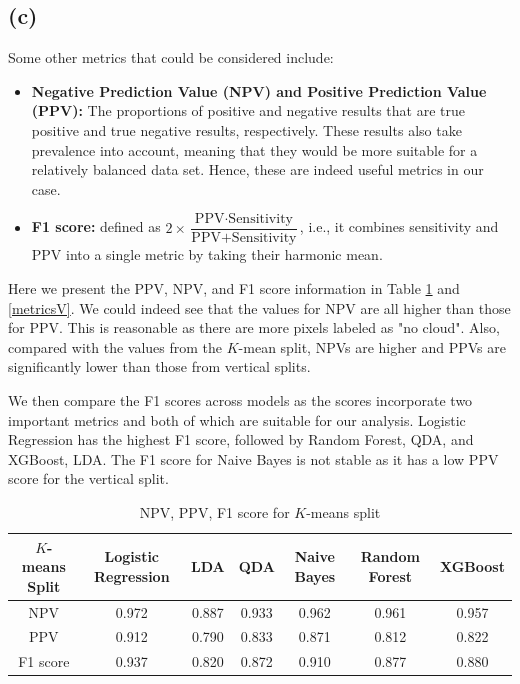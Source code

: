 \documentclass[11pt]{article}
\theoremstyle{definition}
\begin{document}
\subsection*{(c)}
Some other metrics that could be considered include:

\begin{itemize}
\item \textbf{Negative Prediction Value (NPV) and Positive Prediction Value (PPV):} The proportions of positive and negative results that are true positive and true negative results, respectively. These results also take prevalence into account, meaning that they would be more suitable for a relatively balanced data set. Hence, these are indeed useful metrics in our case.

\item \textbf{F1 score:} defined as \( 2 \times \dfrac{\text{PPV}\cdot \text{Sensitivity}}{\text{PPV} + \text{Sensitivity}}\), i.e., it combines sensitivity and PPV into a single metric by taking their harmonic mean.
\end{itemize}


Here we present the PPV, NPV, and F1 score information in Table \ref{metricsK} and \ref{metricsV}. We could indeed see that the values for NPV are all higher than those for PPV. This is reasonable as there are more pixels labeled as "no cloud". Also, compared with the values from the $K$-mean split, NPVs are higher and PPVs are significantly lower than those from vertical splits. 

We then compare the F1 scores across models as the scores incorporate two important metrics and both of which are suitable for our analysis. Logistic Regression has the highest F1 score, followed by Random Forest, QDA, and XGBoost, LDA. The F1 score for Naive Bayes is not stable as it has a low PPV score for the vertical split. 

\begin{table}[h]
    \centering
    \begin{tabular}{c||c|c|c|c|c|c}
    $K$-means Split & Logistic Regression & LDA & QDA & Naive Bayes & Random Forest & XGBoost \\
    \hline
    \hline
    NPV
    & 0.972 & 0.887 & 0.933 & 0.962 & 0.961 & 0.957 \\
    \hline
    PPV
    & 0.912
    & 0.790 & 0.833 & 0.871 & 0.812 & 0.822 \\
    \hline
    F1 score
    & 0.937 & 0.820 & 0.872 & 0.910 & 0.877 & 0.880
    \end{tabular}
    \caption{NPV, PPV, F1 score for $K$-means split}
    \label{metricsK}
\end{table}
\FloatBarrier
\end{document}
